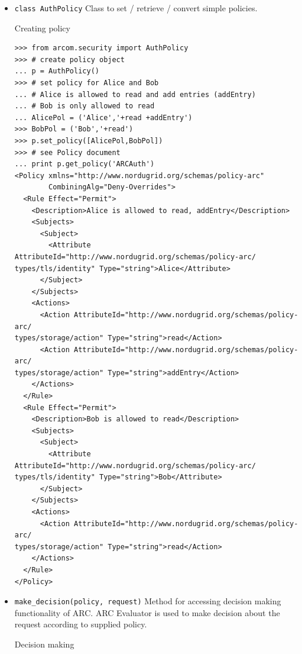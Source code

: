 \documentclass{article}
\begin{document}
\begin{flushleft}
\begin{itemize}
  \item{ \verb$class AuthPolicy$\newline
  Class to set / retrieve / convert simple policies.
    \begin{example}
      \caption{Creating policy}\label{policyex}
\begin{verbatim}
>>> from arcom.security import AuthPolicy
>>> # create policy object
... p = AuthPolicy()
>>> # set policy for Alice and Bob
... # Alice is allowed to read and add entries (addEntry)
... # Bob is only allowed to read
... AlicePol = ('Alice','+read +addEntry')
>>> BobPol = ('Bob','+read')
>>> p.set_policy([AlicePol,BobPol])
>>> # see Policy document
... print p.get_policy('ARCAuth')
<Policy xmlns="http://www.nordugrid.org/schemas/policy-arc" 
        CombiningAlg="Deny-Overrides">
  <Rule Effect="Permit">
    <Description>Alice is allowed to read, addEntry</Description>
    <Subjects>
      <Subject>
        <Attribute AttributeId="http://www.nordugrid.org/schemas/policy-arc/
types/tls/identity" Type="string">Alice</Attribute>
      </Subject>
    </Subjects>
    <Actions>
      <Action AttributeId="http://www.nordugrid.org/schemas/policy-arc/
types/storage/action" Type="string">read</Action>
      <Action AttributeId="http://www.nordugrid.org/schemas/policy-arc/
types/storage/action" Type="string">addEntry</Action>
    </Actions>
  </Rule>
  <Rule Effect="Permit">
    <Description>Bob is allowed to read</Description>
    <Subjects>
      <Subject>
        <Attribute AttributeId="http://www.nordugrid.org/schemas/policy-arc/
types/tls/identity" Type="string">Bob</Attribute>
      </Subject>
    </Subjects>
    <Actions>
      <Action AttributeId="http://www.nordugrid.org/schemas/policy-arc/
types/storage/action" Type="string">read</Action>
    </Actions>
  </Rule>
</Policy>
\end{verbatim}
    \end{example}
  }
\end{itemize}

\begin{itemize}
  \item{ \verb$make_decision(policy, request)$\newline
  Method for accessing decision making functionality of ARC.
  ARC Evaluator is used to make decision about the request
  according to supplied policy.
    \begin{example}
      \caption{Decision making}\label{decisionex}
\begin{verbatim}


\end{verbatim}
\end{example}}
\end{itemize}
\end{flushleft}
\end{document}
